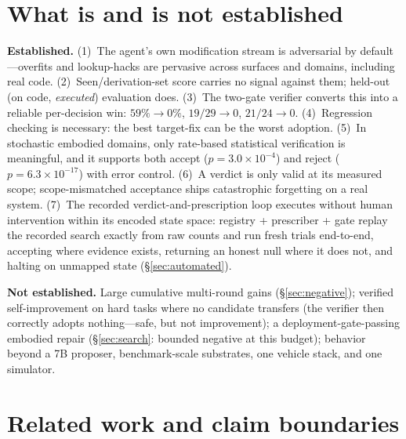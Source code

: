 \documentclass{article}
\begin{document}
\section{What is and is not established}
\label{sec:established}

\textbf{Established.} (1)~The agent's own modification stream is adversarial by default---overfits and
lookup-hacks are pervasive across surfaces and domains, including real code. (2)~Seen/derivation-set
score carries no signal against them; held-out (on code, \emph{executed}) evaluation does. (3)~The
two-gate verifier converts this into a reliable per-decision win: $59\%\!\to\!0\%$, $19/29\!\to\!0$,
$21/24\!\to\!0$. (4)~Regression checking is necessary: the best target-fix can be the worst adoption.
(5)~In stochastic embodied domains, only rate-based statistical verification is meaningful, and it
supports both accept ($p=3.0\times10^{-4}$) and reject ($p=6.3\times10^{-17}$) with error control.
(6)~A verdict is only valid at its measured scope; scope-mismatched acceptance ships catastrophic
forgetting on a real system. (7)~The recorded verdict-and-prescription loop executes without human
intervention within its encoded state space: registry + prescriber + gate replay the recorded search
exactly from raw counts and run fresh trials end-to-end, accepting where evidence exists, returning an
honest null where it does not, and halting on unmapped state (\S\ref{sec:automated}).

\textbf{Not established.} Large cumulative multi-round gains (\S\ref{sec:negative}); verified
self-improvement on hard tasks where no candidate transfers (the verifier then correctly adopts
nothing---safe, but not improvement); a deployment-gate-passing embodied repair (\S\ref{sec:search}:
bounded negative at this budget); behavior beyond a 7B proposer, benchmark-scale substrates, one vehicle
stack, and one simulator.

\section{Related work and claim boundaries}
\label{sec:related}
\end{document}
